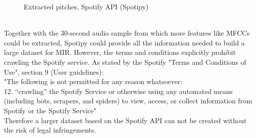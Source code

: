 \begin{figure}[htbp]
	\centering
	\caption{Extracted pitches, Spotify API (Spotipy)}
	\label{fig:spotify}
\end{figure}
\FloatBarrier
\ \\
Together with the 30-second audio sample from which more features like MFCCs could be extracted, Spotipy could provide all the information needed to build a large dataset for MIR. However, the terms and conditions explicitly prohibit crawling the Spotify service. As stated by the Spotify "Terms and Conditions of Use", section 9 (User guidelines):\\
"The following is not permitted for any reason whatsoever:\newline
[...]\\
12. “crawling” the Spotify Service or otherwise using any automated means (including bots, scrapers, and spiders) to view, access, or collect information from Spotify or the Spotify Service"~\cite{spottac1}\\
Therefore a larger dataset based on the Spotify API can not be created without the risk of legal infringements. %

